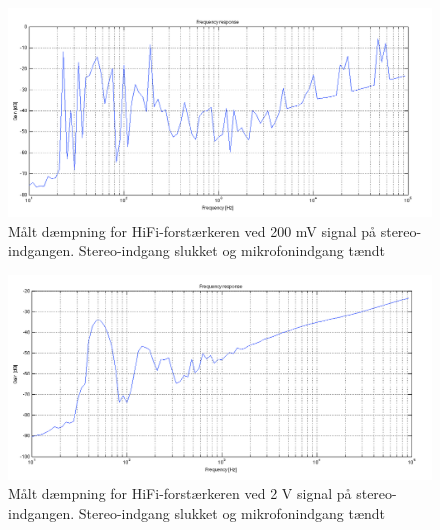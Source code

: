 \begin{figure}[h]
\centering
\includegraphics[width=\textwidth]{maalerapporter/final/daempning/final_daempning_stereo_200mv_micon.png}
\caption{Målt dæmpning for HiFi-forstærkeren ved 200 mV signal på stereo-indgangen. Stereo-indgang slukket og mikrofonindgang tændt}
\label{maalerapport_final15}
\end{figure}

\begin{figure}[h]
\centering
\includegraphics[width=\textwidth]{maalerapporter/final/daempning/final_daempning_stereo_2v_micon.png}
\caption{Målt dæmpning for HiFi-forstærkeren ved 2 V signal på stereo-indgangen. Stereo-indgang slukket og mikrofonindgang tændt}
\label{maalerapport_final16}
\end{figure}